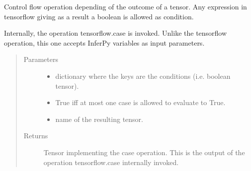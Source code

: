 \documentclass[letterpaper,10pt,english]{sphinxmanual}
\begin{document}
\begin{fulllineitems}
\label{\detokenize{modules/inferpy.util:inferpy.util.ops.case}}
Control flow operation depending of the outcome of a tensor. Any expression
in tensorflow giving as a result a boolean is allowed as condition.

Internally, the operation tensorflow.case is invoked. Unlike the tensorflow operation, this one
accepts InferPy variables as input parameters.
\begin{quote}\begin{description}
\item[{Parameters}] \leavevmode\begin{itemize}
\item {} 
 \textendash{} dictionary where the keys are the conditions (i.e. boolean tensor).

\item {} 
 \textendash{} True iff at most one case is allowed to evaluate to True.

\item {} 
 \textendash{} name of the resulting tensor.

\end{itemize}

\item[{Returns}] \leavevmode
Tensor implementing the case operation. This is the output of the operation
tensorflow.case internally invoked.

\end{description}\end{quote}

\end{fulllineitems}

\end{document}
